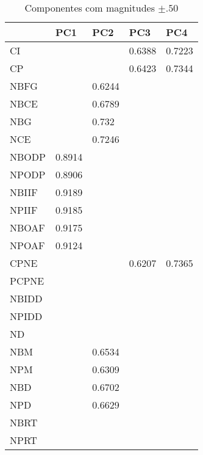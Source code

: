 \begin{table}[H]
\centering
\begin{tabular}{@{}lllll@{}}
\toprule
\textbf{} & \textbf{PC1} & \textbf{PC2} & \textbf{PC3} & \textbf{PC4} \\ \midrule
CI        &              &              & 0.6388       & 0.7223       \\
CP        &              &              & 0.6423       & 0.7344       \\
NBFG      &              & 0.6244       &              &              \\
NBCE      &              & 0.6789       &              &              \\
NBG       &              & 0.732        &              &              \\
NCE       &              & 0.7246       &              &              \\
NBODP     & 0.8914       &              &              &              \\
NPODP     & 0.8906       &              &              &              \\
NBIIF     & 0.9189       &              &              &              \\
NPIIF     & 0.9185       &              &              &              \\
NBOAF     & 0.9175       &              &              &              \\
NPOAF     & 0.9124       &              &              &              \\
CPNE      &              &              & 0.6207       & 0.7365       \\
PCPNE     &              &              &              &              \\
NBIDD     &              &              &              &              \\
NPIDD     &              &              &              &              \\
ND        &              &              &              &              \\
NBM       &              & 0.6534       &              &              \\
NPM       &              & 0.6309       &              &              \\
NBD       &              & 0.6702       &              &              \\
NPD       &              & 0.6629       &              &              \\
NBRT      &              &              &              &              \\
NPRT      &              &              &              &              \\ \bottomrule
\end{tabular}
\caption{Componentes com magnitudes $\pm.50$}
\label{my-label}
\end{table}
